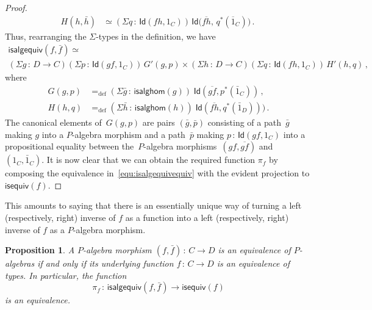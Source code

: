 \documentclass[10pt,a4paper,oneside,reqno]{amsart}
\numberwithin{equation}{section}
\theoremstyle{mythm}
\newtheorem{proposition}[theorem]{Proposition}
\theoremstyle{mydef}
\theoremstyle{myrmk}
\newcommand{\defeq}{=_{\mathrm{def}}}
\newcommand{\co}{\,{:}\,}
\newcommand{\isequiv}{\mathsf{isequiv}}
\newcommand{\Id}{\mathsf{Id}}
\newcommand{\isalgequiv}{\mathsf{isalgequiv}}
\begin{document}
\begin{proof}
\begin{align*}
H(h, \bar{h}) & \simeq (\Sigma q \co \Id( f h ,  1_C) ) \, 
	\Id\big( \overline{fh}   ,\, q^*( \overline{1}_C)  \big) \,. \
\end{align*}
Thus, rearranging the $\Sigma$-types in the definition, we have
\begin{multline}
\label{equ:isalgequivequiv}
\isalgequiv(f, \bar{f}) \simeq \\ 
 (\Sigma g \co D \to C)  (\Sigma p \co \Id(g f ,  1_C) ) \, G'(g,p) \times
   (\Sigma h \co D \to C)   (\Sigma q \co \Id( f h ,  1_C) )\,  H'(h,q) \, ,
\end{multline}
where 
\begin{align} 
G(g,p) & \defeq (\Sigma \bar{g} \co \mathsf{isalghom}(g)) \; \Id( \overline{gf}, p^*(\bar{1}_C)) \, , 
\label{equ:alggp} \\
H(h,q) & \defeq (\Sigma \bar{h} \co \mathsf{isalghom}(h)) \; \Id( \overline{fh}, q^*(\bar{1}_D)) ) \, .
\label{equ:alghq}
\end{align}
The  canonical elements of~$G(g,p)$ are pairs $(\bar{g}, \bar{p})$ consisting of  a path~$\bar{g}$ making
$g$ into a $P$-algebra morphism and a path~$\bar{p}$ making $p \co \Id(gf, 1_C)$ into a propositional
equality between the~$P$-algebra morphisms~$(gf, \overline{gf})$ and~$(1_C, \bar{1}_C)$. It is now
clear that we can obtain the required function $\pi_f$ by composing the equivalence in~\eqref{equ:isalgequivequiv}
with the evident projection to $\isequiv(f)$. 
\end{proof} 

This amounts to saying that there is an essentially unique way of turning a left
(respectively, right) inverse of $f$ as a function into a left (respectively, right) inverse of $f$
as a $P$-algebra morphism.

\begin{proposition}\label{WAlgSpace} A $P$-algebra morphism $(f, \bar{f}) \co C \to D$ is an equivalence of
$P$-algebras if and only
if its underlying function $f \co C \to D$ is an equivalence of types. In particular, the function 
\[
\pi_f \co \isalgequiv(f, \bar{f})  \to \mathsf{isequiv}(f)  
\]
is an equivalence. 
\end{proposition}  
\end{document}
